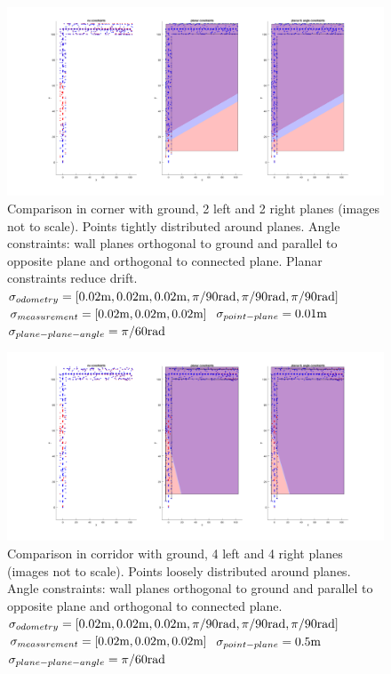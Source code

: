 \documentclass[a4paper,11pt]{article}
\begin{document}
\begin{figure}
\centering
\includegraphics[width=1.15\textwidth,trim={3cm 0 0 0},clip]{cornerLowNoise.png}
\caption{\label{fig:cornerLowNoise} Comparison in corner with ground, 2 left and 2 right planes (images not to scale). Points tightly distributed around planes. Angle constraints: wall planes orthogonal to ground and parallel to opposite plane and orthogonal to connected plane. Planar constraints reduce drift. \newline
$\sigma_{odometry} = [0.02\textnormal{m},0.02\textnormal{m},0.02\textnormal{m},
\pi/90\textnormal{rad},\pi/90\textnormal{rad},\pi/90\textnormal{rad}]$\newline
$\sigma_{measurement} = [0.02\textnormal{m},0.02\textnormal{m},0.02\textnormal{m}]$\newline
$\sigma_{point-plane} = 0.01\textnormal{m}$\newline
$\sigma_{plane-plane-angle} = \pi/60\textnormal{rad}$}
\end{figure}

\begin{figure}
\centering
\includegraphics[width=1.15\textwidth,trim={3.5cm 0 0 0},clip]{cornerHighNoise.png}
\caption{\label{fig:cornerHighNoise} Comparison in corridor with ground, 4 left and 4 right planes (images not to scale). Points loosely distributed around planes. Angle constraints: wall planes orthogonal to ground and parallel to opposite plane and orthogonal to connected plane. \newline
$\sigma_{odometry} = [0.02\textnormal{m},0.02\textnormal{m},0.02\textnormal{m},
\pi/90\textnormal{rad},\pi/90\textnormal{rad},\pi/90\textnormal{rad}]$\newline
$\sigma_{measurement} = [0.02\textnormal{m},0.02\textnormal{m},0.02\textnormal{m}]$\newline
$\sigma_{point-plane} = 0.5\textnormal{m}$\newline
$\sigma_{plane-plane-angle} = \pi/60\textnormal{rad}$}
\end{figure}
\end{document}
